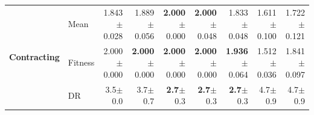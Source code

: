 \begin{table}[htbp]
{\begin{tabular}{ll||r|rrrrrr}
\midrule
\multirow{3}{*}{\textbf{Contracting}} & Mean & \cellcolor[HTML]{F6DEA8} 1.843{\scriptsize\color{black!60}$\pm$0.028} & 1.889{\scriptsize\color{black!60}$\pm$0.056} & \textbf{2.000}{\scriptsize\color{black!60}$\pm$0.000} & \textbf{2.000}{\scriptsize\color{black!60}$\pm$0.048} & 1.833{\scriptsize\color{black!60}$\pm$0.048} & \textcolor{black!60}{1.611}{\scriptsize\color{black!60}$\pm$0.100} & \textcolor{black!60}{1.722}{\scriptsize\color{black!60}$\pm$0.121} \\
 & Fitness & \cellcolor[HTML]{F2CF80} 2.000{\scriptsize\color{black!60}$\pm$0.000} & \textbf{2.000}{\scriptsize\color{black!60}$\pm$0.000} & \textbf{2.000}{\scriptsize\color{black!60}$\pm$0.000} & \textbf{2.000}{\scriptsize\color{black!60}$\pm$0.000} & \textbf{1.936}{\scriptsize\color{black!60}$\pm$0.064} & \textcolor{black!60}{1.512}{\scriptsize\color{black!60}$\pm$0.036} & \textcolor{black!60}{1.841}{\scriptsize\color{black!60}$\pm$0.097} \\
 & DR & 3.5{\scriptsize\color{black!60}$\pm$0.0} & 3.7{\scriptsize\color{black!60}$\pm$0.7} & \textbf{2.7}{\scriptsize\color{black!60}$\pm$0.3} & \textbf{2.7}{\scriptsize\color{black!60}$\pm$0.3} & \textbf{2.7}{\scriptsize\color{black!60}$\pm$0.3} & \textcolor{black!60}{4.7}{\scriptsize\color{black!60}$\pm$0.9} & \textcolor{black!60}{4.7}{\scriptsize\color{black!60}$\pm$0.9} \\
\bottomrule
\end{tabular}
}
\end{table}

